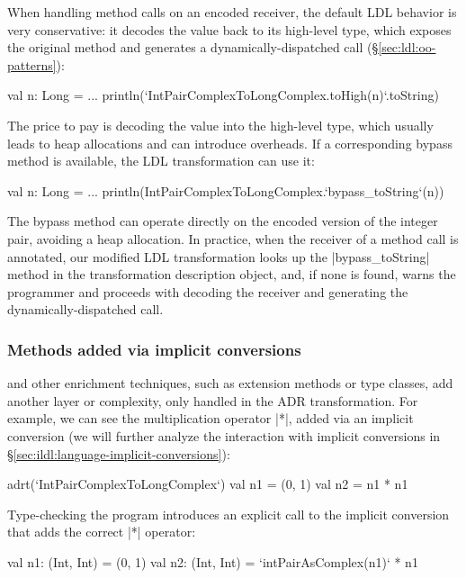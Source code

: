 When handling method calls on an encoded receiver, the default LDL behavior is very conservative: it decodes the value back to its high-level type, which exposes the original method and generates a dynamically-dispatched call (\S\ref{sec:ldl:oo-patterns}):

\begin{lstlisting-nobreak}
val n: Long = ...
println(`IntPairComplexToLongComplex.toHigh(n)`.toString)
\end{lstlisting-nobreak}

The price to pay is decoding the value into the high-level type, which usually leads to heap allocations and can introduce overheads. If a corresponding bypass method is available, the LDL transformation can use it:

\begin{lstlisting-nobreak}
val n: Long = ...
println(IntPairComplexToLongComplex.`bypass_toString`(n))
\end{lstlisting-nobreak}

The bypass method can operate directly on the encoded version of the integer pair, avoiding a heap allocation. In practice, when the receiver of a method call is annotated, our modified LDL transformation looks up the |bypass_toString| method in the transformation description object, and, if none is found, warns the programmer and proceeds with decoding the receiver and generating the dynamically-dispatched call.

\subsubsection{Methods added via implicit conversions} and other enrichment techniques, such as extension methods or type classes, add another layer or complexity, only handled in the ADR transformation. For example, we can see the multiplication operator |*|, added via an implicit conversion (we will further analyze the interaction with implicit conversions in \S\ref{sec:ildl:language-implicit-conversions}):

\begin{lstlisting-nobreak}
adrt(`IntPairComplexToLongComplex`) {
  val n1 = (0, 1)
  val n2 = n1 * n1
}
\end{lstlisting-nobreak}

Type-checking the program introduces an explicit call to the implicit conversion that adds the correct |*| operator:

\begin{lstlisting-nobreak}
val n1: (Int, Int) = (0, 1)
val n2: (Int, Int) = `intPairAsComplex(n1)` * n1
\end{lstlisting-nobreak}

